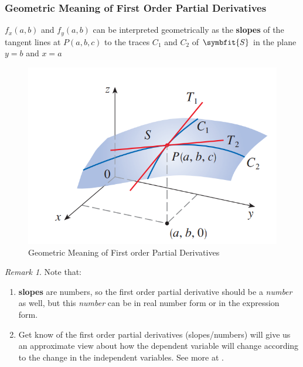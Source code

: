 \documentclass[math,code]{amznotes}
\theoremstyle{remark}
\newtheorem*{remark}{Remark}
\begin{document}
\subsubsection{Geometric Meaning of First Order Partial Derivatives} \label{sec:geometric-meaing-of-first-order-partial-deri}
$f_x(a,b)$ and $f_y(a,b)$ can be interpreted geometrically as the {\color{red} \textbf{slopes}} of the tangent lines at $P(a,b,c)$ to the traces $C_1$ and $C_2$ of $\symbfit{S}$ in the plane $y=b$ and $x=a$
\begin{figure}[H]
    \centering
    \includegraphics[width=0.3\linewidth]{images/partial-derivative-geometric-meaning.png}
    \caption{Geometric Meaning of First order Partial Derivatives}
    \label{fig:geo-meaning-first-order-partial-derivative}
\end{figure}
\begin{notebox}
    \begin{remark}
        Note that:
        \begin{enumerate}
            \item \textbf{slopes} are numbers, so the first order partial derivative should be a \textit{number} as well, but this \textit{number} can be in real number form or in the expression form.
            \item Get know of the first order partial derivatives (slopes/numbers) will give us an approximate view about how the dependent variable will change according to the change in the independent variables. See more at .
        \end{enumerate}
    \end{remark}
\end{notebox}
\end{document}
